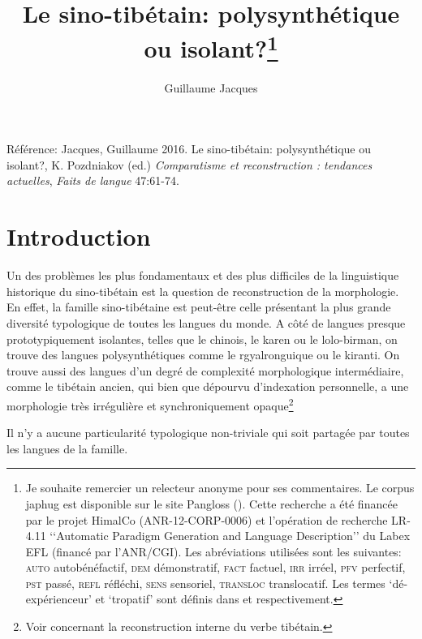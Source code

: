\documentclass[oldfontcommands,oneside,a4paper,11pt]{article}
\begin{document}
 
\title{Le sino-tibétain: polysynthétique ou isolant?\footnote{Je souhaite remercier un relecteur anonyme pour ses commentaires. Le corpus japhug est disponible sur le site Pangloss (\citealt{michailovsky14pangloss}). Cette recherche a été financée par le projet HimalCo (ANR-12-CORP-0006) et l'opération de recherche LR-4.11 ‘‘Automatic Paradigm Generation and Language Description’’ du Labex EFL (financé par l'ANR/CGI).
Les abréviations utilisées sont les suivantes: \textsc{auto} autobénéfactif, \textsc{dem} démonstratif, \textsc{fact} factuel, \textsc{irr} irréel, \textsc{pfv} perfectif, \textsc{pst} passé, \textsc{refl} réfléchi,  \textsc{sens} sensoriel, \textsc{transloc} translocatif. Les termes `dé-expérienceur' et `tropatif' sont  définis dans \citet{jacques12demotion} et \citet{jacques13tropative} respectivement. }  }
\author{Guillaume Jacques}
\maketitle

Référence: Jacques, Guillaume 2016. Le sino-tibétain: polysynthétique ou isolant?, K. Pozdniakov (ed.) \textit{Comparatisme et reconstruction : tendances actuelles}, \textit{Faits de langue} 47:61-74.

\section{Introduction}
Un des problèmes les plus fondamentaux et des plus difficiles de la linguistique historique du sino-tibétain est la question de reconstruction de la morphologie. En effet, la famille sino-tibétaine est peut-être celle présentant la plus grande diversité typologique de toutes les langues du monde. A côté de langues presque prototypiquement isolantes, telles que le chinois, le karen ou le lolo-birman, on trouve des langues polysynthétiques comme le rgyalronguique ou le kiranti. On trouve aussi des langues d'un degré de complexité morphologique intermédiaire, comme le tibétain ancien, qui bien que dépourvu d'indexation personnelle, a une morphologie très irrégulière et synchroniquement opaque\footnote{Voir \citet{hill05vbri, jacques10ndr, jacques12internal, hill14dempsey, hill14voicing, hill15lan} concernant la reconstruction interne du verbe tibétain.}

 


 Il n'y a aucune particularité typologique non-triviale qui soit partagée par toutes les langues de la famille. 
\end{document}
